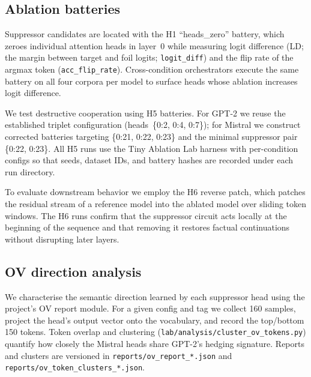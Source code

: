 \subsection{Ablation batteries}
Suppressor candidates are located with the H1 ``heads\_zero'' battery, which zeroes individual attention heads in layer~0 while measuring logit difference (LD; the margin between target and foil logits; \texttt{logit\_diff}) and the flip rate of the argmax token (\texttt{acc\_flip\_rate}).
Cross-condition orchestrators execute the same battery on all four corpora per model to surface heads whose ablation increases logit difference.

We test destructive cooperation using H5 batteries.
For GPT-2 we reuse the established triplet configuration (heads~\{0:2, 0:4, 0:7\}); for Mistral we construct corrected batteries targeting \{0:21, 0:22, 0:23\} and the minimal suppressor pair \{0:22, 0:23\}.
All H5 runs use the Tiny Ablation Lab harness with per-condition configs so that seeds, dataset IDs, and battery hashes are recorded under each run directory.

To evaluate downstream behavior we employ the H6 reverse patch, which patches the residual stream of a reference model into the ablated model over sliding token windows.
The H6 runs confirm that the suppressor circuit acts locally at the beginning of the sequence and that removing it restores factual continuations without disrupting later layers.

\subsection{OV direction analysis}
We characterise the semantic direction learned by each suppressor head using the project’s OV report module.
For a given config and tag we collect 160 samples, project the head’s output vector onto the vocabulary, and record the top/bottom 150 tokens.
Token overlap and clustering (\texttt{lab/analysis/cluster\_ov\_tokens.py}) quantify how closely the Mistral heads share GPT-2’s hedging signature.
Reports and clusters are versioned in \texttt{reports/ov\_report\_*.json} and \texttt{reports/ov\_token\_clusters\_*.json}.

